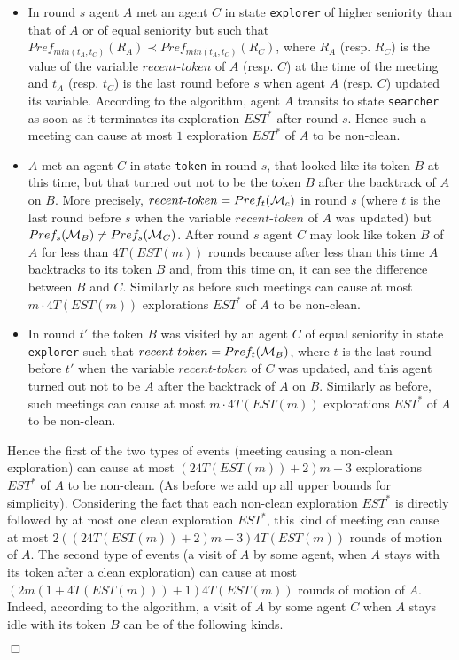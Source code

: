 \documentclass[11pt]{article}
\newcommand{\qed}{\hfill $\Box$ \bigbreak}
\newenvironment{proof}{\noindent {\bf Proof.}}{\qed}
\newcommand{\cM}{{\cal M}}
\begin{document}
\begin{proof}
\begin{itemize}
\item
   {In round $s$ agent $A$ met an agent $C$ in state {\tt explorer} of higher seniority than that of $A$ or of equal seniority but such that $Pref_{min(t_A,t_C)}(R_A) \prec Pref_{min(t_A,t_C)}(R_C)$, where $R_A$ (resp. $R_C$) is the value of the variable $recent$-$token$ of $A$ (resp. $C$) at the time of the meeting and $t_A$ (resp. $t_C$) is the last round before $s$ when agent $A$ (resp. $C$) updated its variable. According to the algorithm, agent $A$ transits to state {\tt searcher} as soon as it terminates its exploration $EST^*$ after round $s$. Hence such a meeting can cause at most $1$ exploration $EST^*$ of $A$ to be non-clean.}    
     
   \item
    $A$ met an agent $C$  in state {\tt token} in round $s$, that looked like its token $B$ at this time, but that turned out not to be the token $B$ after the backtrack
    of $A$ on $B$. More precisely, $recent\mbox{-}token=Pref_t(\cM_c)$ in round $s$ (where $t$ is the last round before $s$ when the variable $recent$-$token$ of $A$ was updated)
    but $Pref_s(\cM_B) \neq Pref_s(\cM_C)$. After round $s$ agent $C$ may look like token $B$ of $A$ for {less than}  $4T(EST(m))$ rounds because after {less than} this time
    $A$ backtracks to its token $B$ and, from this time on, it can see the difference between $B$ and $C$.
    Similarly as before such meetings can cause at most {$m \cdot 4T(EST(m))$  explorations $EST^*$ of $A$ to be non-clean.} 
    
    \item
    In round $t'$ the token $B$ was visited by an agent $C$ of equal seniority in state {\tt explorer} such that $recent\mbox{-}token = Pref_t(\cM_B)$, where $t$ is the last round before $t'$ when the variable $recent$-$token$ of $C$ was updated, and this agent turned out not to be $A$ after 
    the backtrack of $A$ on $B$. Similarly as before, such meetings can cause at most {$m \cdot 4T(EST(m))$ explorations $EST^*$ of $A$ to be non-clean.} 
     \end{itemize}
 {Hence the first of the two types of events (meeting causing a non-clean exploration) can cause at most {$(24T(EST(m)) +2)m+3$} explorations $EST^*$ of $A$ to be non-clean. (As before we add up all upper bounds for simplicity). Considering the fact that each non-clean exploration $EST^*$ is directly followed by at most one clean exploration $EST^*$, this kind of meeting can cause at most {$2((24T(EST(m)) +2)m+3)4T(EST(m))$} rounds of motion of $A$.}
 {The second type of events (a visit of $A$ by some agent, when $A$ stays with its token after a clean exploration)
     can cause at most $(2m(1+4T(EST(m)))+1)4T(EST(m))$ rounds of motion of $A$. Indeed, according to the algorithm, a visit of $A$ by some agent $C$ when $A$ stays idle with its token $B$
can be of the following kinds.}


\end{proof}
\end{document}
